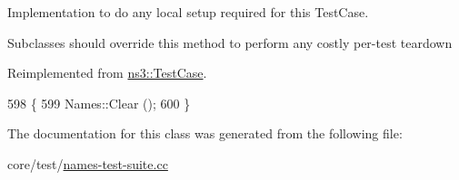Implementation to do any local setup required for this Test\+Case. 

Subclasses should override this method to perform any costly per-\/test teardown 

Reimplemented from \hyperlink{classns3_1_1TestCase_a8917f1604e28d312a8086f76291e3c46}{ns3\+::\+Test\+Case}.


\begin{DoxyCode}
598 \{
599   Names::Clear ();
600 \}
\end{DoxyCode}


The documentation for this class was generated from the following file\+:\begin{DoxyCompactItemize}
\item 
core/test/\hyperlink{names-test-suite_8cc}{names-\/test-\/suite.\+cc}\end{DoxyCompactItemize}
